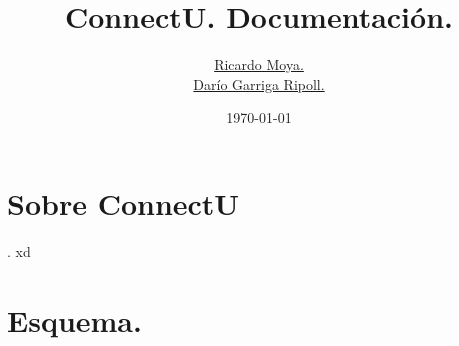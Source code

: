 \documentclass[12pt]{article}
\begin{document}
  \title{ConnectU. Documentaci\'{o}n.}
  \author{
    \href{https://github.com/Onelio}{Ricardo Moya.}\\
    \href{https://github.com/dgrr}{Dar\'{i}o Garriga Ripoll.}
  }
  \date{\today}
  \maketitle
  \tableofcontents
  \newpage

  \section{Sobre ConnectU}.
    xd
  \section{Esquema.}
\end{document}
